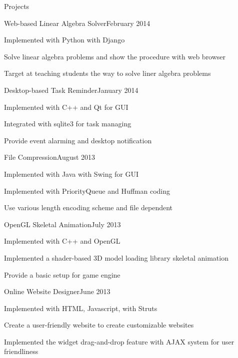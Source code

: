 \documentclass{resume} %
\begin{document}
\begin{rSection}{Projects}
\begin{rSubsection}{Web-based Linear Algebra Solver}{February 2014}{}{}
\item Implemented with Python with Django
\item Solve linear algebra problems and show the procedure with web browser
\item Target at teaching students the way to solve liner algebra problems
\end{rSubsection}

\begin{rSubsection}{Desktop-based Task Reminder}{January 2014}{}{}
\item Implemented with C++ and Qt for GUI
\item Integrated with sqlite3 for task managing
\item Provide event alarming and desktop notification
\end{rSubsection}

\begin{rSubsection}{File Compression}{August 2013}{}{}
\item Implemented with Java with Swing for GUI
\item Implemented with PriorityQueue and Huffman coding
\item Use various length encoding scheme and file dependent
\end{rSubsection}


\begin{rSubsection}{OpenGL Skeletal Animation}{July 2013}{}{}
\item Implemented with C++ and OpenGL
\item Implemented a shader-based 3D model loading library skeletal animation
\item Provide a basic setup for game engine
\end{rSubsection}


\begin{rSubsection}{Online Website Designer}{June 2013}{}{}
\item Implemented with HTML, Javascript, with Struts
\item Create a user-friendly website to create customizable websites
\item Implemented the widget drag-and-drop feature with AJAX system for user friendliness
\end{rSubsection}


\end{rSection}
\end{document}

